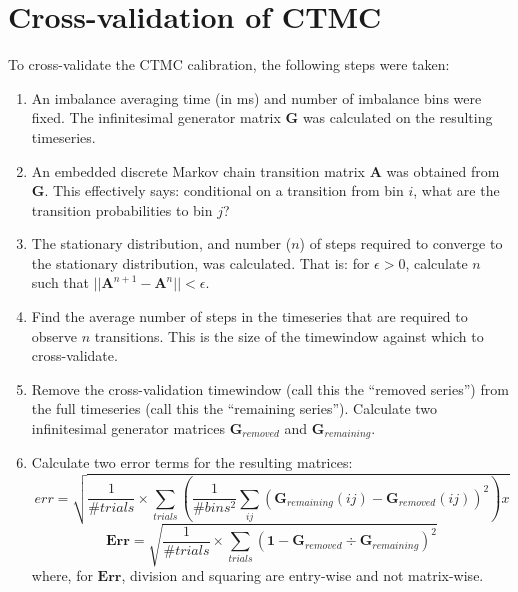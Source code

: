 \documentclass[12pt]{article}
\newcommand\mat[1]{\boldsymbol{#1}}
\begin{document}
\section*{Cross-validation of CTMC}
To cross-validate the CTMC calibration, the following steps were taken:
\begin{enumerate}
\item An imbalance averaging time (in ms) and number of imbalance bins were fixed. The infinitesimal generator matrix $\mat{G}$ was calculated on the resulting timeseries. 
\item An embedded discrete Markov chain transition matrix $\mat{A}$ was obtained from $\mat{G}$. This effectively says: conditional on a transition from bin $i$, what are the transition probabilities to bin $j$?
\item The stationary distribution, and number ($n$) of steps required to converge to the stationary distribution, was calculated. That is: for $\epsilon > 0$, calculate $n$ such that $||\mat{A}^{n+1} - \mat{A}^n|| < \epsilon$.
\item Find the average number of steps in the timeseries that are required to observe $n$ transitions. This is the size of the timewindow against which to cross-validate. 
\item Remove the cross-validation timewindow (call this the ``removed series'') from the full timeseries (call this the ``remaining series''). Calculate two infinitesimal generator matrices $\mat{G}_{removed}$ and $\mat{G}_{remaining}$.
\item Calculate two error terms for the resulting matrices:
$$err = \sqrt{\dfrac{1}{\#trials} \times \sum\limits_{trials} \left( \dfrac{1}{\#bins^2} \sum\limits_{ij} (\mat{G}_{remaining}(ij) - \mat{G}_{removed}(ij))^2 \right)x} $$
$$\mat{Err} = \sqrt{\dfrac{1}{\#trials} \times \sum\limits_{trials} (\mat{1} - \mat{G}_{removed} \div \mat{G}_{remaining})^2 }$$
where, for $\mat{Err}$, division and squaring are entry-wise and not matrix-wise.
\end{enumerate}
\end{document}
